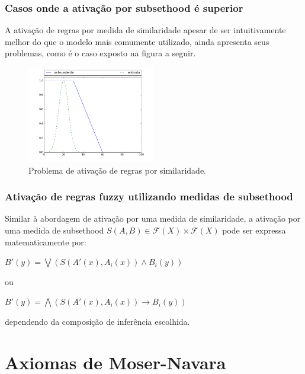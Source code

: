 \documentclass{beamer}
\theoremstyle{definition}
\begin{document}
\begin{frame}
\frametitle{Casos onde a ativação por subsethood é superior}
A ativação de regras por medida de similaridade apesar de ser intuitivamente melhor do que o modelo mais comumente utilizado, ainda apresenta seus problemas, como é o caso exposto na figura a seguir.
\begin{figure}[H]
 \centering
  \includegraphics[width=0.5\textwidth]{problema_similaridade.png}
  \caption{Problema de ativação de regras por similaridade.}
  \label{fig:problema_similaridade}
\end{figure}
\end{frame}

\begin{frame}
\frametitle{Ativação de regras fuzzy utilizando medidas de subsethood}
Similar à abordagem de ativação por uma medida de similaridade, a ativação por uma medida de subsethood $S(A,B) \in \mathcal{F}(X)\times\mathcal{F}(X)$ pode ser expressa matematicamente por:
\begin{center}
$B'(y) = \bigvee (S(A'(x),A_{i}(x)) \wedge B_{i}(y))$
\end{center}
\begin{center}
ou
\end{center}
\begin{center}
$B'(y) = \bigwedge (S(A'(x),A_{i}(x)) \rightarrow B_{i}(y))$
\end{center}
dependendo da composição de inferência escolhida.
\end{frame}


\section{Axiomas de Moser-Navara} %
\end{document}
